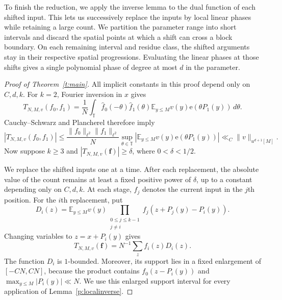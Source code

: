 \documentclass[12pt]{amsart}
\newcommand{\1}{\mathbf 1}
\newcommand{\e}{\mathrm e}
\theoremstyle{definition}
\begin{document}
To finish the reduction, we apply the inverse lemma to the dual
function of each shifted input. This lets us successively replace
the inputs by local linear phases while retaining a large count.
We partition the parameter range into short intervals and discard
the spatial points at which a shift can cross a block boundary.
On each remaining interval and residue class, the shifted arguments
stay in their respective spatial progressions. Evaluating the linear
phases at those shifts gives a single polynomial phase of degree
at most \(d\) in the parameter.

\begin{proof}[Proof of Theorem~\ref{t:main}]
All implicit constants in this proof depend only on $C,d,k$.
For $k=2$, Fourier inversion in $x$ gives
\[
 T_{N,M,v}(f_0,f_1)
 =\frac1N\int_{\mathbb T}\widehat f_0(-\theta)\widehat f_1(\theta)
       \mathbb E_{y\leq M}v(y)\e(\theta P_1(y))\,d\theta.
\]
Cauchy--Schwarz and Plancherel therefore imply
\[
 |T_{N,M,v}(f_0,f_1)|
 \leq \frac{\|f_0\|_{\ell^2}\|f_1\|_{\ell^2}}{N}
       \sup_{\theta\in\mathbb T}
       \left|\mathbb E_{y\leq M}v(y)\e(\theta P_1(y))\right|
 \ll_C \|v\|_{u^{d+1}[M]}.
\]
Now suppose $k\geq3$ and $|T_{N,M,v}(\mathbf f)|\geq\delta$,
where $0<\delta<1/2$.

We replace the shifted inputs one at a time. After each replacement,
the absolute value of the count remains at least a fixed positive
power of \(\delta\), up to a constant depending only on \(C,d,k\). At each stage, $f_j$ denotes the
current input in the $j$th position. For the $i$th replacement, put
\[
 D_i(z)=\mathbb E_{y\leq M}v(y)
       \prod_{\substack{0\leq j\leq k-1\\j\ne i}}
       f_j(z+P_j(y)-P_i(y)).
\]
Changing variables to $z=x+P_i(y)$ gives
$$T_{N,M,v}(\mathbf f)=N^{-1}\sum_z f_i(z)D_i(z).$$
The function $D_i$ is $1$-bounded. Moreover, its support lies in
a fixed enlargement of $[-CN,CN]$, because the product contains
$f_0(z-P_i(y))$ and $\max_{y\leq M}|P_i(y)|\ll N$.
We use this enlarged support interval for every application of
Lemma~\ref{p:localinverse}. 


\end{proof}
\end{document}
